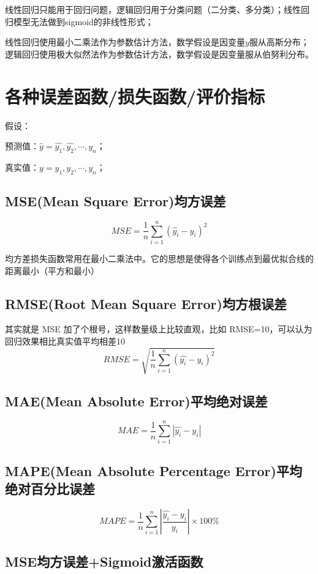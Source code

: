 \documentclass[12pt]{article}
\begin{document}
线性回归只能用于回归问题，逻辑回归用于分类问题（二分类、多分类）；线性回归模型无法做到sigmoid的非线性形式；

线性回归使用最小二乘法作为参数估计方法，数学假设是因变量$y$服从高斯分布；逻辑回归使用极大似然法作为参数估计方法，数学假设是因变量服从伯努利分布\cite{Deep_Learning_Recommender_System}。

\section{各种误差函数/损失函数/评价指标}
假设：

预测值：$\hat{y} = {\hat{y_1},\hat{y_2},\cdots,\hat{y_n}}$；

真实值：$y = {y_1, y_2, \cdots, y_n}$；

\subsection{MSE(Mean Square Error)均方误差}
$$MSE = \frac{1}{n}\sum_{i=1}^{n}(\hat{y_i} - y_i)^2$$

均方差损失函数常用在最小二乘法中。它的思想是使得各个训练点到最优拟合线的距离最小（平方和最小）

\subsection{RMSE(Root Mean Square Error)均方根误差}
其实就是 MSE 加了个根号，这样数量级上比较直观，比如 RMSE=10，可以认为回归效果相比真实值平均相差10
$$RMSE = \sqrt{\frac{1}{n}\sum_{i=1}^{n}(\hat{y_i} - y_i)^2}$$

\subsection{MAE(Mean Absolute Error)平均绝对误差}
$$MAE = \frac{1}{n}\sum_{i=1}^{n}|\hat{y_i} - y_i|$$

\subsection{MAPE(Mean Absolute Percentage Error)平均绝对百分比误差}
$$MAPE = \frac{1}{n}\sum_{i=1}^{n}|\frac{\hat{y_i} - y_i}{y_i}|\times 100\%$$

\subsection{MSE均方误差+Sigmoid激活函数\cite{Commonly_Loss_Functions}}
\end{document}
